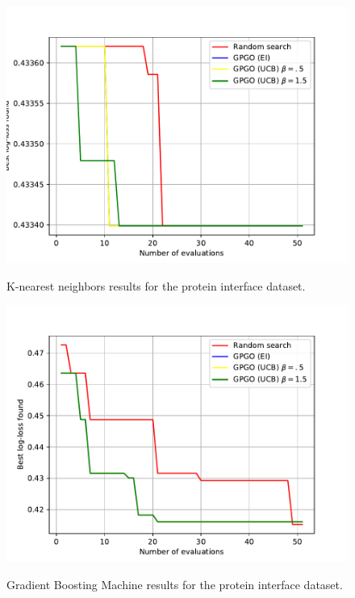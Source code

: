 \documentclass[10pt,a4paper,twoside]{book}
\begin{document}
\begin{figure}
\centering
\caption{K-nearest neighbors results for the protein interface dataset.}
\includegraphics[scale=0.75]{figures/chapter4/pinter/knn}
\label{fig:affknn}
\end{figure}

\begin{figure}
\centering
\caption{Gradient Boosting Machine results for the protein interface dataset.}
\includegraphics[scale=0.75]{figures/chapter4/pinter/gbm}
\label{fig:affgbm}
\end{figure}
\end{document}
